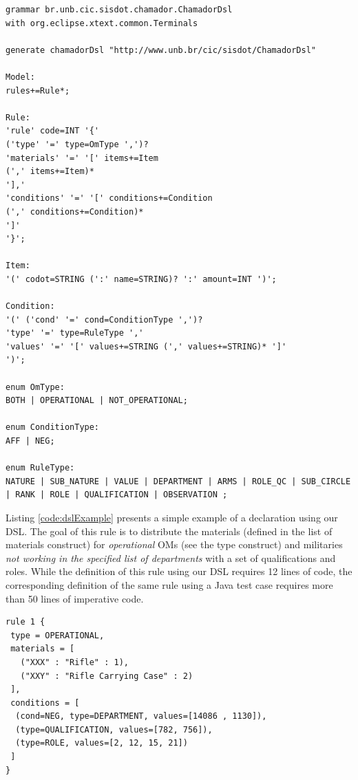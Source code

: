 \begin{lstlisting}[frame=single, language=Xtext, caption={\it Xtext grammar defining the DSL structure}, label={code:gramatica},basicstyle=\scriptsize]
grammar br.unb.cic.sisdot.chamador.ChamadorDsl 
with org.eclipse.xtext.common.Terminals

generate chamadorDsl "http://www.unb.br/cic/sisdot/ChamadorDsl"

Model:
rules+=Rule*;

Rule:
'rule' code=INT '{'
('type' '=' type=OmType ',')?
'materials' '=' '[' items+=Item
(',' items+=Item)*
'],'
'conditions' '=' '[' conditions+=Condition
(',' conditions+=Condition)*
']'
'}';

Item:
'(' codot=STRING (':' name=STRING)? ':' amount=INT ')';

Condition:
'(' ('cond' '=' cond=ConditionType ',')?
'type' '=' type=RuleType ','
'values' '=' '[' values+=STRING (',' values+=STRING)* ']'
')';

enum OmType:
BOTH | OPERATIONAL | NOT_OPERATIONAL;

enum ConditionType:
AFF | NEG;

enum RuleType:
NATURE | SUB_NATURE | VALUE | DEPARTMENT | ARMS | ROLE_QC | SUB_CIRCLE | RANK | ROLE | QUALIFICATION | OBSERVATION ;
\end{lstlisting}

Listing \ref{code:dslExample} presents a simple example of a \shc declaration using our DSL. 
The goal of this rule is to distribute 
the materials (defined in the list of materials construct) for \emph{operational} OMs (see the 
type construct) and militaries \emph{not working in the specified list of 
departments} with a set of qualifications and roles. While the definition of this rule 
using our DSL requires 12 lines of code, the corresponding definition of the same rule 
using a Java test case requires more than 50 lines of imperative code.

\begin{small}
\begin{lstlisting}[frame=single, language=DSL, caption={\it Example of a \shc declaration using our DSL}, label={code:dslExample}]
rule 1 { 
 type = OPERATIONAL, 
 materials = [ 
   ("XXX" : "Rifle" : 1), 
   ("XXY" : "Rifle Carrying Case" : 2)
 ], 
 conditions = [ 
  (cond=NEG, type=DEPARTMENT, values=[14086 , 1130]),
  (type=QUALIFICATION, values=[782, 756]), 
  (type=ROLE, values=[2, 12, 15, 21])
 ]
}
\end{lstlisting}
\end{small}



